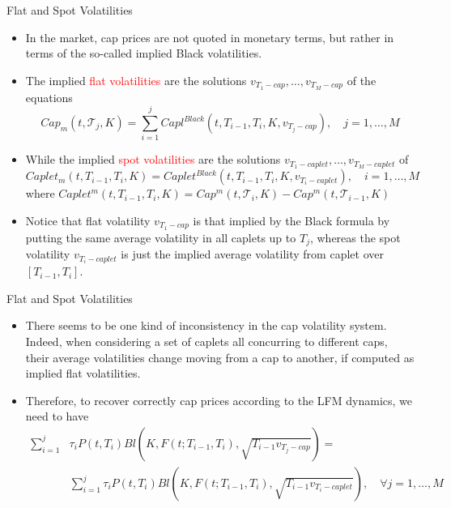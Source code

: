 \documentclass{beamer}
\begin{document}
\begin{frame}{Flat and Spot Volatilities}
  \begin{itemize}
  \item In the market, cap prices are not quoted in monetary terms, but rather in terms of the so-called implied Black volatilities. 
  \item The implied \textcolor{red}{flat volatilities} are the solutions $v_{T_1-cap},\ldots, v_{T_M-cap}$ of the equations
    \begin{equation*}
      Cap_m(t, \mathcal{T}_j, K) = \sum_{i=1}^j Capl^{Black}(t, T_{i-1}, T_i,K,v_{T_j-cap}),\quad j=1, \ldots,M
    \end{equation*}
  \item While the implied \textcolor{red}{spot volatilities} are the solutions $v_{T_1-caplet},\ldots, v_{T_M-caplet}$ of
    \begin{equation*}
      Caplet_m(t, T_{i-1},T_i,K) = Caplet^{Black}(t, T_{i-1}, T_i,K,v_{T_i-caplet}),\quad i=1, \ldots,M
    \end{equation*} 
    where $Caplet^m(t, T_{i-1}, T_i, K) = Cap^m(t, \mathcal{T}_i,K)-Cap^m(t, \mathcal{T}_{i-1},K)$
  \item Notice that flat volatility $v_{T_1-cap}$ is that implied by the Black formula by putting the same average volatility in all caplets up to $T_j$, whereas the spot volatility $v_{T_i-caplet}$ is just the implied average volatility from caplet over $[T_{i-1}, T_i]$.
  \end{itemize}
\end{frame}

\begin{frame}{Flat and Spot Volatilities}
  \begin{itemize}
  \item There seems to be one kind of inconsistency in the cap volatility system. Indeed, when considering a set of caplets all concurring to different caps, their average volatilities change moving from a cap to another, if computed as implied flat volatilities.
  \item Therefore, to recover correctly cap prices according to the LFM dynamics, we need to have
    \begin{equation*}
      \begin{aligned}
	\sum_{i=1}^j&\tau_iP(t,T_i)Bl(K,F(t;T_{i-1},T_i),\sqrt{T_{i-1}v_{T_j-cap}}) = \\ &\sum_{i=1}^j\tau_iP(t,T_i)Bl(K,F(t;T_{i-1},T_i),\sqrt{T_{i-1}v_{T_i-caplet}}),\quad \forall j = 1,\dots, M
      \end{aligned}
    \end{equation*}
  \end{itemize}
\end{frame}	
\end{document}
